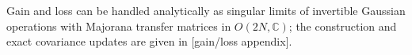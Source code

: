 Gain and loss can be handled analytically as singular limits of invertible
Gaussian operations with Majorana transfer matrices in $O(2N,\mathbb C)$;
the construction and exact covariance updates are given in
[gain/loss appendix].
